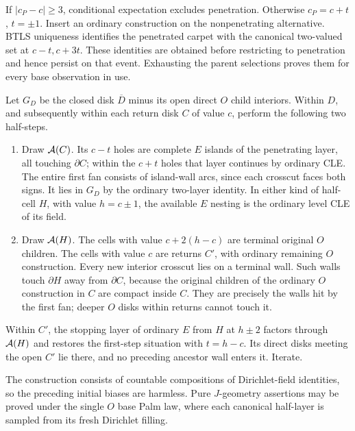 If $|c_P-c|\ge3$, conditional expectation excludes penetration.  Otherwise $c_P=c+t$, $t=\pm1$.  Insert an ordinary construction on the nonpenetrating alternative.  BTLS uniqueness identifies the penetrated carpet with the canonical two-valued set at $c-t,c+3t$.  These identities are obtained before restricting to penetration and hence persist on that event.  Exhausting the parent selections proves them for every base observation in use.

\begin{definition}\label{wall:paired-sweep}
Let $G_D$ be the closed disk $\overline D$ minus its open direct $O$ child interiors.  Within $D$, and subsequently within each return disk $C$ of value $c$, perform the following two half-steps.
\begin{enumerate}
\item Draw $\mathcal A(C)$.  Its $c-t$ holes are complete $E$ islands of the penetrating layer, all touching $\partial C$; within the $c+t$ holes that layer continues by ordinary CLE.  The entire first fan consists of island-wall arcs, since each crosscut faces both signs.  It lies in $G_D$ by the ordinary two-layer identity.  In either kind of half-cell $H$, with value $h=c\pm1$, the available $E$ nesting is the ordinary level CLE of its field.
\item Draw $\mathcal A(H)$.  The cells with value $c+2(h-c)$ are terminal original $O$ children.  The cells with value $c$ are returns $C'$, with ordinary remaining $O$ construction.  Every new interior crosscut lies on a terminal wall.  Such walls touch $\partial H$ away from $\partial C$, because the original children of the ordinary $O$ construction in $C$ are compact inside $C$.  They are precisely the walls hit by the first fan; deeper $O$ disks within returns cannot touch it.
\end{enumerate}
Within $C'$, the stopping layer of ordinary $E$ from $H$ at $h\pm2$ factors through $\mathcal A(H)$ and restores the first-step situation with $t=h-c$.  Its direct disks meeting the open $C'$ lie there, and no preceding ancestor wall enters it.  Iterate.
\end{definition}

The construction consists of countable compositions of Dirichlet-field identities, so the preceding initial biases are harmless.  Pure $J$-geometry assertions may be proved under the single $O$ base Palm law, where each canonical half-layer is sampled from its fresh Dirichlet filling.

